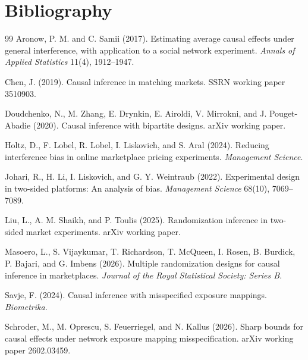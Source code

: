 \documentclass[11pt]{article}
\theoremstyle{definition}
\theoremstyle{plain}
\theoremstyle{remark}
\begin{document}
\section*{Bibliography}
\begin{thebibliography}{99}
Aronow, P. M. and C. Samii (2017).
Estimating average causal effects under general interference, with application to a social network experiment.
\emph{Annals of Applied Statistics} 11(4), 1912--1947.

Chen, J. (2019).
Causal inference in matching markets.
SSRN working paper 3510903.

Doudchenko, N., M. Zhang, E. Drynkin, E. Airoldi, V. Mirrokni, and J. Pouget-Abadie (2020).
Causal inference with bipartite designs.
arXiv working paper.

Holtz, D., F. Lobel, R. Lobel, I. Liskovich, and S. Aral (2024).
Reducing interference bias in online marketplace pricing experiments.
\emph{Management Science}.

Johari, R., H. Li, I. Liskovich, and G. Y. Weintraub (2022).
Experimental design in two-sided platforms: An analysis of bias.
\emph{Management Science} 68(10), 7069--7089.

Liu, L., A. M. Shaikh, and P. Toulis (2025).
Randomization inference in two-sided market experiments.
arXiv working paper.

Masoero, L., S. Vijaykumar, T. Richardson, T. McQueen, I. Rosen, B. Burdick, P. Bajari, and G. Imbens (2026).
Multiple randomization designs for causal inference in marketplaces.
\emph{Journal of the Royal Statistical Society: Series B}.

Savje, F. (2024).
Causal inference with misspecified exposure mappings.
\emph{Biometrika}.

Schroder, M., M. Oprescu, S. Feuerriegel, and N. Kallus (2026).
Sharp bounds for causal effects under network exposure mapping misspecification.
arXiv working paper 2602.03459.
\end{thebibliography}
\end{document}
